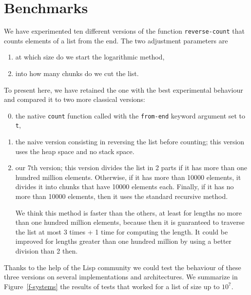 \section{Benchmarks}
We have experimented ten different versions of the function \texttt{reverse-count}
that counts elements of a list from the end. The two adjustment parameters are
\begin{enumerate}
\item at which size do we start the logarithmic method,
\item into how many chunks do we cut the list.
\end{enumerate}

To present here, we have retained the one with the best experimental behaviour
and compared it to two more classical versions:
\begin{enumerate}
\setcounter{enumi}{-1}
\item the native \texttt{count} function called with the \texttt{from-end} keyword argument set to \texttt{t},
\item the naive version consisting in reversing the list before counting;
this version uses the heap space and no stack space.
\setcounter{enumi}{6}
\item our 7th version;
this version divides the list in 2 parts if it has more than one
hundred million elements.  Otherwise, if it has more than 10000
elements, it divides it into chunks that have 10000 elements each.
Finally, if it has no more than 10000 elements, then it uses the
standard recursive method.

We think this method is faster than the others, at least for
lengths no more than one hundred million elements, because then it
is guaranteed to traverse the list at most 3 times + 1 time for
computing the length.  It could be improved for lengths greater
than one hundred million by using a better division than 2 then.
\end{enumerate}

Thanks to the help of the Lisp community we could test the behaviour
of these three versions on several implementations and architectures.
We summarize in Figure~\ref{f-systems} the results of tests that 
worked for a list of size up to $10^7$.

